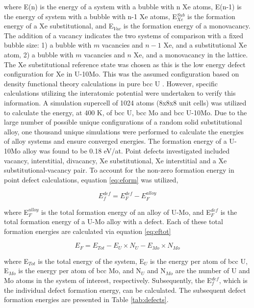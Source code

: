 \documentclass[review]{elsarticle}
\begin{document}
where E(n) is the energy of a system with a bubble with n Xe atoms, E(n-1) is the energy of system with a bubble with n-1 Xe atoms, E$_{Xe}^{Sub}$ is the formation energy of a Xe substitutional, and E$_{Vac}$ is the formation energy of a monovacancy. The addition of a vacancy indicates the two systems of comparison with a fixed bubble size: 1) a bubble with $m$ vacancies and $n-1$ Xe, and a substitutional Xe atom, 2) a bubble with $m$ vacancies and $n$ Xe, and a monovacancy in the lattice. The Xe substitutional reference state was chosen as this is the low energy defect configuration for Xe in U-10Mo. This was the assumed configuration based on density functional theory calculations in pure bcc U \cite{beelerASTM}. However, specific calculations utilizing the interatomic potential were undertaken to verify this information. A simulation supercell of 1024 atoms (8x8x8 unit cells) was utilized to calculate the energy, at 400 K, of bcc U, bcc Mo and bcc U-10Mo. Due to the large number of possible unique configurations of a random solid substitutional alloy, one thousand unique simulations were performed to calculate the energies of alloy systems and ensure converged energies. The formation energy of a U-10Mo alloy was found to be 0.18 eV/at. Point defects investigated included vacancy, interstitial, divacancy, Xe substitutional, Xe interstitial and a Xe substitutional-vacancy pair. To account for the non-zero formation energy in point defect calculations, equation \ref{eq:eform} was utilized, 

\begin{equation}
\label{eq:eform}
E_f^{def}= E_F^{def} - E_F^{alloy} 
\end{equation}

where E$_F^{alloy}$ is the total formation energy of an alloy of U-Mo, and E$_F^{def}$ is the total formation energy of a U-Mo alloy with a defect. Each of these total formation energies are calculated via equation \ref{eq:eftot}

\begin{equation}
\label{eq:eftot}
E_F= E_{Tot} - E_U\times N_U - E_{Mo}\times N_{Mo}  
\end{equation}

where E$_{Tot}$ is the total energy of the system, E$_U$ is the energy per atom of bcc U, E$_{Mo}$ is the energy per atom of bcc Mo, and N$_U$ and N$_{Mo}$ are the number of U and Mo atoms in the system of interest, respectively. Subsequently, the E$_f^{def}$, which is the individual defect formation energy, can be calculated. The subsequent defect formation energies are presented in Table \ref{tab:defects}. 
\end{document}
